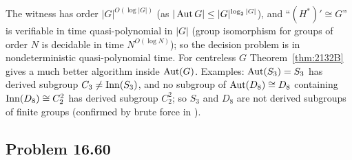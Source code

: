 \begin{remark}
The witness has order $|G|^{O(\log|G|)}$ (as $|\operatorname{Aut} G|\le|G|^{\log_2|G|}$), and ``$(H^*)'\cong G$'' is verifiable
in time quasi-polynomial in $|G|$ (group isomorphism for groups of order $N$ is decidable in time
$N^{O(\log N)}$); so the decision problem is in nondeterministic quasi-polynomial time. For centreless $G$
Theorem~\ref{thm:2132B} gives a much better algorithm inside $\operatorname{Aut}(G)$. Examples: $\operatorname{Aut}(S_3)=S_3$ has derived
subgroup $C_3\ne\operatorname{Inn}(S_3)$, and no subgroup of $\operatorname{Aut}(D_8)\cong D_8$ containing $\operatorname{Inn}(D_8)\cong C_2^2$ has derived
subgroup $C_2^2$; so $S_3$ and $D_8$ are not derived subgroups of finite groups (confirmed by brute force in
).
\end{remark}

\subsection{Problem 16.60}\label{app:1660}

